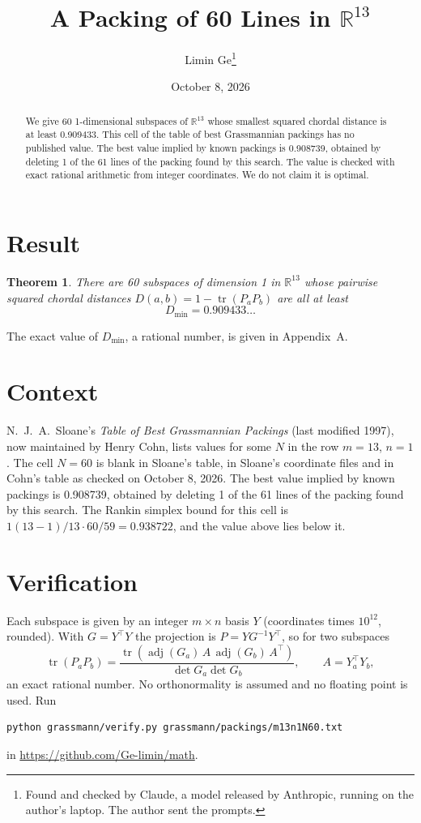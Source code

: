 \documentclass[11pt,a4paper]{article}
\title{A Packing of 60 Lines in $\mathbb{R}^{13}$}
\author{Limin Ge\thanks{Found and checked by Claude, a model released by Anthropic, running on the author's laptop. The author sent the prompts.}}
\date{October 8, 2026}
\newtheorem*{theorem}{Theorem}
\begin{document}
\maketitle
\begin{abstract}
We give 60 1-dimensional subspaces of $\mathbb{R}^{13}$ whose smallest squared chordal distance is at least 0.909433. This cell of the table of best Grassmannian packings has no published value. The best value implied by known packings is 0.908739, obtained by deleting 1 of the 61 lines of the packing found by this search. The value is checked with exact rational arithmetic from integer coordinates. We do not claim it is optimal.
\end{abstract}

\section{Result}
\begin{theorem}
There are 60 subspaces of dimension 1 in $\mathbb{R}^{13}$ whose pairwise squared chordal distances $D(a,b) = 1 - \operatorname{tr}(P_aP_b)$ are all at least
\[ D_{\min} = 0.909433\ldots \]
\end{theorem}
The exact value of $D_{\min}$, a rational number, is given in Appendix~A.


\section{Context}
N.~J.~A.~Sloane's \emph{Table of Best Grassmannian Packings} (last modified 1997), now maintained by Henry Cohn, lists values for some $N$ in the row $m=13$, $n=1$. The cell $N=60$ is blank in Sloane's table, in Sloane's coordinate files and in Cohn's table as checked on October 8, 2026. The best value implied by known packings is 0.908739, obtained by deleting 1 of the 61 lines of the packing found by this search. The Rankin simplex bound for this cell is $1(13-1)/13\cdot 60/59 = 0.938722$, and the value above lies below it.


\section{Verification}
Each subspace is given by an integer $m\times n$ basis $Y$ (coordinates times $10^{12}$, rounded). With $G=Y^\top Y$ the projection is $P=YG^{-1}Y^\top$, so for two subspaces
\[ \operatorname{tr}(P_aP_b)=\frac{\operatorname{tr}(\operatorname{adj}(G_a)\,A\,\operatorname{adj}(G_b)\,A^\top)}{\det G_a\det G_b},\qquad A=Y_a^\top Y_b, \]
an exact rational number. No orthonormality is assumed and no floating point is used. Run
\begin{verbatim}
python grassmann/verify.py grassmann/packings/m13n1N60.txt
\end{verbatim}
in \url{https://github.com/Ge-limin/math}.
\end{document}
